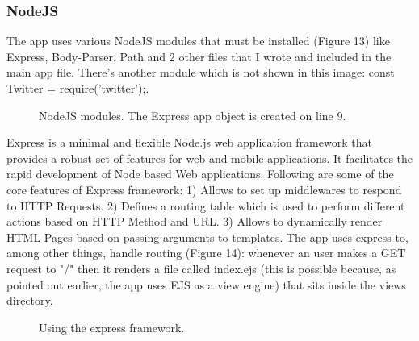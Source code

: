 \documentclass[12pt]{article} %
\begin{document}
   \subsubsection{NodeJS  \cite{nodejs}} The app uses various NodeJS modules that must be installed (Figure 13) like Express, Body-Parser, Path and 2 other files that I wrote and included in the main app file.
	There's another module which is not shown in this image: const Twitter = require('twitter');.

	\begin{figure}[H] %
	\caption{NodeJS modules. The Express app object is created on line 9.}
	\label{NodeJS}
	\end{figure}

	\noindent Express \cite{express} is a minimal and flexible Node.js web application framework that provides a robust set of features for web and mobile applications.
	It facilitates the rapid development of Node based Web applications. Following are some of the core features of Express framework:
	1) Allows to set up middlewares to respond to HTTP Requests.
	2) Defines a routing table which is used to perform different actions based on HTTP Method and URL.
	3) Allows to dynamically render HTML Pages based on passing arguments to templates.
	\newline
	The app uses express to, among other things, handle routing (Figure 14): whenever an user makes a GET request to "/" then it renders a file called index.ejs (this is possible
	because, as pointed out earlier, the app uses EJS as a view engine) that sits inside the views directory.
	

	\begin{figure}[H] %
	\caption{Using the express framework.}
	\label{express}
	\end{figure}
\end{document}
